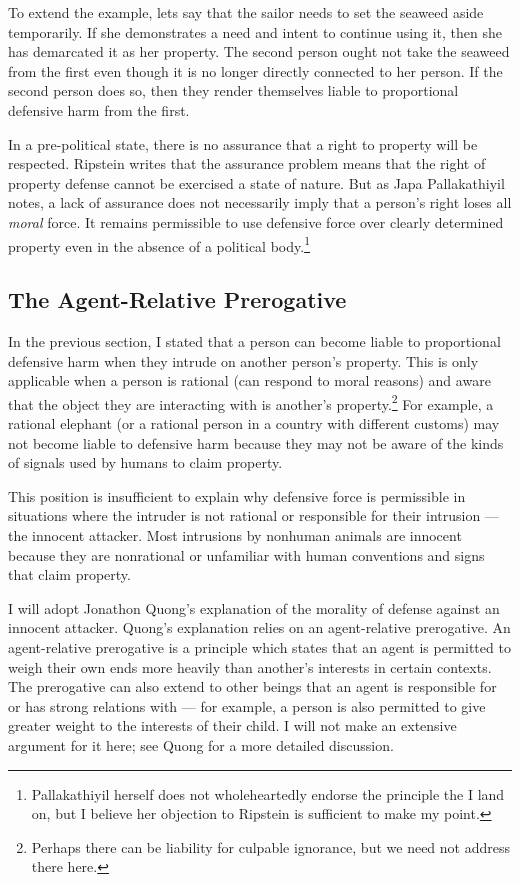 	To extend the example, lets say that the sailor needs to set the seaweed
	aside temporarily. If she demonstrates a need and intent to continue using
	it, then she has demarcated it as her property. The second person ought not
	take the seaweed from the first even though it is no longer directly
	connected to her person. If the second person does so, then they render
	themselves liable to proportional defensive harm from the first.

	In a pre-political state, there is no assurance that a right to property
	will be respected. Ripstein writes that the assurance problem means that
	the right of property defense cannot be exercised a state of
	nature.\autocite[162]{ripstein_force_freedom} But as Japa Pallakathiyil
	notes, a lack of assurance does not necessarily imply that a person’s right
	loses all \emph{moral} force. It remains permissible to use defensive force
	over clearly determined property even in the absence of a political
	body.\footnote{Pallakathiyil herself does not wholeheartedly endorse the
	principle the I land on, but I believe her objection to Ripstein is
sufficient to make my point.}

	\subsection{The Agent-Relative Prerogative}

	In the previous section, I stated that a person can become liable to
	proportional defensive harm when they intrude on another person’s property.
	This is only applicable when a person is rational (can respond to moral
	reasons) and aware that the object they are interacting with is another’s
	property.\footnote{Perhaps there can be liability for culpable ignorance,
	but we need not address there here.} For example, a rational elephant (or a
	rational person in a country with different customs) may not become liable
	to defensive harm because they may not be aware of the kinds of signals
	used by humans to claim property.

	This position is insufficient to explain why defensive force is permissible
	in situations where the intruder is not rational or responsible for their
	intrusion --- the innocent attacker.  Most intrusions by nonhuman animals
	are innocent because they are nonrational or unfamiliar with human
	conventions and signs that claim property.

	I will adopt Jonathon Quong’s explanation of the morality of defense against
	an innocent attacker. Quong’s explanation relies on an agent-relative
	prerogative. An agent-relative prerogative is a principle which states that
	an agent is permitted to weigh their own ends more heavily than another’s
	interests in certain contexts. The prerogative can also extend to other
	beings that an agent is responsible for or has strong relations with ---
	for example, a person is also permitted to give greater weight to the
	interests of their child. I will not make an extensive argument for it
	here; see Quong for a more detailed discussion.

